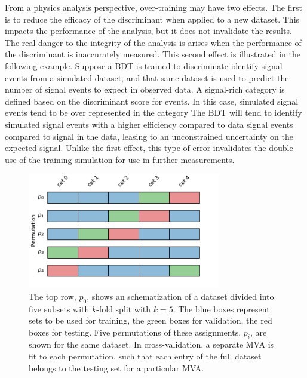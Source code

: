 From a physics analysis perspective, over-training may have two effects.
The first is to reduce the efficacy of the discriminant when applied to a new dataset.
This impacts the performance of the analysis, but it does not invalidate the results.
The real danger to the integrity of the analysis is arises when the performance of the discriminant is inaccurately measured.
This second effect is illustrated in the following example.
Suppose a BDT is trained to discriminate identify signal events from a simulated dataset, and that same dataset is used to predict the number of signal events to expect in observed data.
A signal-rich category is defined based on the discriminant score for events.
In this case, simulated signal events tend to be over represented in the category
The BDT will tend to identify simulated signal events with a higher efficiency compared to data signal events compared to signal in the data, leasing to an unconstrained uncertainty on the expected signal.
Unlike the first effect, this type of error invalidates the double use of the training simulation for use in further measurements.

\begin{figure}[h!]
\captionsetup[subfigure]{position=b}
\centering
\includegraphics[width=0.75\textwidth]{figures/hmm/testTrainVal.pdf}
\caption{The top row, $p_0$, shows an schematization of a dataset divided into five subsets with $k$-fold split with $k=5$.
The blue boxes represent sets to be used for training, the green boxes for validation, the red boxes for testing.
Five permutations of these assignments, $p_i$, are shown for the same dataset.
In cross-validation, a separate MVA is fit to each permutation, such that each entry of the full dataset belongs to the testing set for a particular MVA.
}
\label{fig:testTrainVal}
\end{figure}

